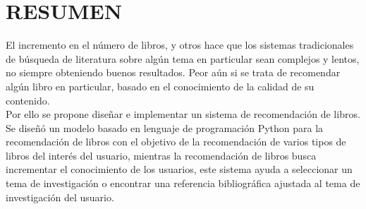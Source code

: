 \section{RESUMEN} 

El incremento en el número de libros, y otros hace que los sistemas tradicionales de búsqueda de literatura sobre algún tema en particular sean complejos y lentos, no siempre obteniendo buenos resultados. Peor aún si se trata de recomendar algún libro en particular, basado en el conocimiento de la calidad de su contenido. 
\\
Por ello se propone diseñar e implementar un sistema de recomendación de libros. Se diseñó un modelo basado en lenguaje de programación Python para la recomendación de libros con el objetivo de la recomendación de varios tipos de libros del interés del usuario, mientras la recomendación de libros busca incrementar el conocimiento de los usuarios, este sistema ayuda a seleccionar un tema de investigación o encontrar una referencia bibliográfica ajustada al tema de investigación del usuario. 

